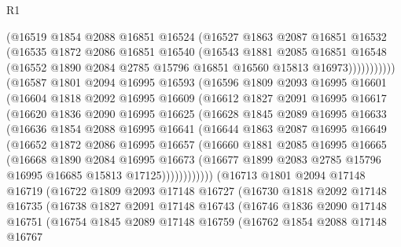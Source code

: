 \begin{lexlean}{R1}
\begin{coremodule}
                (@16519
                  @1854
                  @2088
                  @16851
                  @16524
                  (@16527
                    @1863
                    @2087
                    @16851
                    @16532
                    (@16535
                      @1872
                      @2086
                      @16851
                      @16540
                      (@16543
                        @1881
                        @2085
                        @16851
                        @16548
                        (@16552 @1890 @2084 @2785 @15796 @16851 @16560 @15813 @16973)))))))))))
    (@16587
      @1801
      @2094
      @16995
      @16593
      (@16596
        @1809
        @2093
        @16995
        @16601
        (@16604
          @1818
          @2092
          @16995
          @16609
          (@16612
            @1827
            @2091
            @16995
            @16617
            (@16620
              @1836
              @2090
              @16995
              @16625
              (@16628
                @1845
                @2089
                @16995
                @16633
                (@16636
                  @1854
                  @2088
                  @16995
                  @16641
                  (@16644
                    @1863
                    @2087
                    @16995
                    @16649
                    (@16652
                      @1872
                      @2086
                      @16995
                      @16657
                      (@16660
                        @1881
                        @2085
                        @16995
                        @16665
                        (@16668
                          @1890
                          @2084
                          @16995
                          @16673
                          (@16677 @1899 @2083 @2785 @15796 @16995 @16685 @15813 @17125))))))))))))
    (@16713
      @1801
      @2094
      @17148
      @16719
      (@16722
        @1809
        @2093
        @17148
        @16727
        (@16730
          @1818
          @2092
          @17148
          @16735
          (@16738
            @1827
            @2091
            @17148
            @16743
            (@16746
              @1836
              @2090
              @17148
              @16751
              (@16754
                @1845
                @2089
                @17148
                @16759
                (@16762
                  @1854
                  @2088
                  @17148
                  @16767

\end{coremodule}
\end{lexlean}
